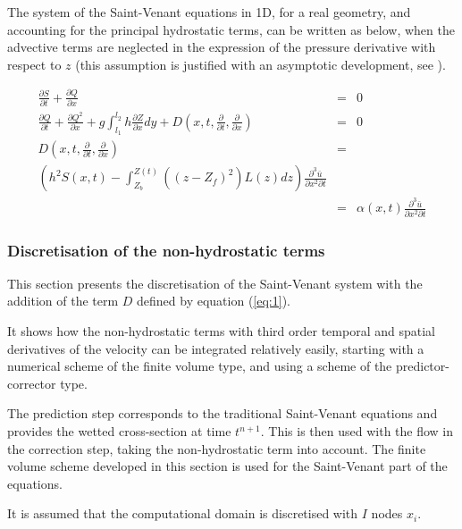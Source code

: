 The system of the Saint-Venant equations in 1D, for a real geometry, and accounting for the principal hydrostatic terms, can be written as below, when the advective terms are neglected in the expression of the pressure derivative with respect to $z$ (this assumption is justified with an asymptotic development, see \cite{BRISTEAU11}).

\begin{eqnarray}
\frac{\partial{S}}{\partial{t}}+\frac{\partial{Q}}{\partial{x}} & = & 0 \\
\frac{\partial{Q}}{\partial{t}}+\frac{\partial{Q^{2}}}{\partial{x}}+g\int_{l_{1}}^{l_{2}}h\frac{\partial{Z}}{\partial{x}}dy+D(x,t,\frac{\partial}{\partial{t}},\frac{\partial}{\partial{x}}) & = & 0 \\
D(x,t,\frac{\partial}{\partial{t}},\frac{\partial}{\partial{x}}) & = & \nonumber \\
\left(h^2S(x,t)-\int_{Z_{b}}^{Z(t)}\left((z-Z_f)^2\right)L(z)dz\right)\frac{\partial^3{\bar{u}}}{\partial{{x}^2}\partial{t}} & & \nonumber \\
& = & \alpha(x,t)\frac{\partial^3{\bar{u}}}{\partial{{x}^2}\partial{t}}
\label{eq:1}
\end{eqnarray}


\subsubsection{Discretisation of the non-hydrostatic terms}

This section presents the discretisation of the Saint-Venant system with the addition of the term $D$ defined by equation (\ref{eq:1}).

It shows how the non-hydrostatic terms with third order temporal and spatial derivatives of the velocity can be integrated relatively easily, starting with a numerical scheme of the finite volume type, and using a scheme of the predictor-corrector type.

The prediction step corresponds to the traditional Saint-Venant equations and provides the wetted cross-section at time $t^{n+1}$. This is then used with the flow in the correction step, taking the non-hydrostatic term into account. The finite volume scheme developed in this section is used for the Saint-Venant part of the equations.

It is assumed that the computational domain is discretised with $I$ nodes $x_i$.

